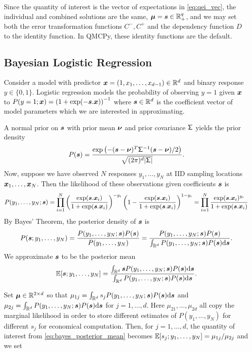 \documentclass{article}[12pt]
\begin{document}
Since the quantity of interest is the vector of expectations in \eqref{eq:qei_vec}, the individual and combined solutions are the same, $\boldsymbol{\mu} = \boldsymbol{s} \in \mathbb{R}_+^q$, and we may set both the error transformation functions $C^-,C^+$ and the dependency function $D$ to the identity function. In QMCPy, these identity functions are the default. 

\subsection{Bayesian Logistic Regression}

Consider a model with predictor $\boldsymbol{x} = (1,x_1, \dots, x_{d-1}) \in \mathbb{R}^d$ and binary response $y \in \{0,1\}$. Logistic regression models the probability of observing $y = 1$ given $\boldsymbol{x}$ to $P(y=1;\boldsymbol{x}) = \left(1+\exp(-\boldsymbol{s}.\boldsymbol{x})\right)^{-1}$ where $\boldsymbol{s} \in \mathbb{R}^d$ is the coefficient vector of model parameters which we are interested in approximating.

A normal prior on $\boldsymbol{s}$ with prior mean $\boldsymbol{\nu}$ and prior covariance $\mathsf{\Sigma}$ yields the prior density
$$P(\boldsymbol{s}) = \frac{\exp\left(-(\boldsymbol{s}-\boldsymbol{\nu})^T\mathsf{\Sigma}^{-1}(\boldsymbol{s}-\boldsymbol{\nu})/2\right)}{\sqrt{(2\pi)^d\lvert \mathsf{\Sigma}\rvert}}.$$ 
Now, suppose we have observed $N$ responses $y_1,\dots,y_N$ at IID sampling locations $\boldsymbol{x}_1,\dots,\boldsymbol{x}_N$. Then the likelihood of these observations given coefficients $\boldsymbol{s}$ is
\begin{equation*}
    P(y_1,\dots,y_N ; \boldsymbol{s}) = \prod_{i=1}^N \left(\frac{\exp(\boldsymbol{s}.\boldsymbol{x}_i)}{1+\exp(\boldsymbol{s}.\boldsymbol{x}_i)}\right)^{-y_i} \left(1-\frac{\exp(\boldsymbol{s}.\boldsymbol{x}_i)}{1+\exp(\boldsymbol{s}.\boldsymbol{x}_i)}\right)^{1-y_i} = \prod_{i=1}^N \frac{\exp(\boldsymbol{s}.\boldsymbol{x}_i)^{y_i}}{1+\exp(\boldsymbol{s}.\boldsymbol{x}_i)}
\end{equation*}
By Bayes' Theorem, the posterior density of $\boldsymbol{s}$ is 
$$P(\boldsymbol{s};y_1,\dots,y_N) = \frac{P(y_1,\dots,y_N;\boldsymbol{s})P(\boldsymbol{s})}{P(y_1,\dots,y_N)} = \frac{P(y_1,\dots,y_N;\boldsymbol{s})P(\boldsymbol{s})}{\int_{\mathbb{R}^d} P(y_1,\dots,y_N;\boldsymbol{s})P(\boldsymbol{s})\mathrm{d}\boldsymbol{s}}.$$
We approximate $\boldsymbol{s}$ to be the posterior mean
\begin{equation}
    \mathbb{E}[\boldsymbol{s};y_1,\dots,y_N] = \frac{\int_{\mathbb{R}^d}\boldsymbol{s} P(y_1,\dots,y_N;\boldsymbol{s})P(\boldsymbol{s})\mathrm{d}\boldsymbol{s}}{\int_{\mathbb{R}^d}P(y_1,\dots,y_N;\boldsymbol{s})P(\boldsymbol{s})\mathrm{d}\boldsymbol{s}}. \label{eq:bayes_posterior_mean}
\end{equation}

Set $\boldsymbol{\mu} \in \mathbb{R}^{2 \times d}$ so that $\mu_{1j} = \int_{\mathbb{R}^d}s_j P(y_1,\dots,y_N;\boldsymbol{s})P(\boldsymbol{s})\mathrm{d}\boldsymbol{s}$ and $\mu_{2j} = \int_{\mathbb{R}^d}P(y_1,\dots,y_N;\boldsymbol{s})P(\boldsymbol{s})\mathrm{d}\boldsymbol{s}$ for $j=1,\dots,d$. Here $\mu_{21},\dots,\mu_{2d}$ all copy the marginal likelihood in order to store different estimates of $P(y_1,\dots,y_N)$ for different $s_j$ for economical computation.  Then, for $j=1,\dots,d$,  the quantity of interest from \eqref{eq:bayes_posterior_mean} becomes $\mathbb{E}[s_j;y_1,\dots,y_N] = \mu_{1j}/\mu_{2j}$ and we set
\end{document}
